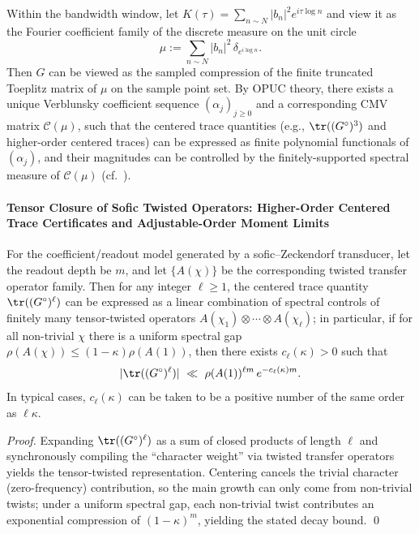 \begin{proposition}\label{prop:gm-toeplitz-cmv-verblunsky-embedding}
Within the bandwidth window, let
\(
K(\tau)=\sum_{n\sim N}|b_n|^2 e^{i\tau\log n}
\)
and view it as the Fourier coefficient family of the discrete measure on the unit circle
\[
\mu:=\sum_{n\sim N}|b_n|^2\,\delta_{e^{i\log n}}.
\]
Then \(G\) can be viewed as the sampled compression of the finite truncated Toeplitz matrix of \(\mu\) on the sample point set.
By OPUC theory, there exists a unique Verblunsky coefficient sequence \((\alpha_j)_{j\ge 0}\) and a corresponding CMV matrix \(\mathcal{C}(\mu)\), such that the centered trace quantities (e.g., \(\tr((G^\circ)^3)\) and higher-order centered traces) can be expressed as finite polynomial functionals of \((\alpha_j)\), and their magnitudes can be controlled by the finitely-supported spectral measure of \(\mathcal{C}(\mu)\) (cf.\ \cite{CanteroMoralVelazquez2003CMV,Simon2005OPUC1}).
\end{proposition}

\paragraph{Tensor Closure of Sofic Twisted Operators: Higher-Order Centered Trace Certificates and Adjustable-Order Moment Limits}
\begin{theorem}\label{thm:gm-tensor-twist-centered-moments}
For the coefficient/readout model generated by a sofic--Zeckendorf transducer, let the readout depth be \(m\), and let \(\{A(\chi)\}\) be the corresponding twisted transfer operator family.
Then for any integer \(\ell\ge 1\), the centered trace quantity \(\tr((G^\circ)^\ell)\) can be expressed as a linear combination of spectral controls of finitely many tensor-twisted operators
\(
A(\chi_1)\otimes\cdots\otimes A(\chi_\ell)
\);
in particular, if for all non-trivial \(\chi\) there is a uniform spectral gap
\(
\rho(A(\chi))\le (1-\kappa)\rho(A(1))
\), then there exists \(c_\ell(\kappa)>0\) such that
\[
|\tr((G^\circ)^\ell)|\ \ll\ \rho(A(1))^{\ell m}\,e^{-c_\ell(\kappa)m}.
\]
In typical cases, \(c_\ell(\kappa)\) can be taken to be a positive number of the same order as \(\ell\kappa\).
\end{theorem}

\begin{proof}
Expanding \(\tr((G^\circ)^\ell)\) as a sum of closed products of length \(\ell\) and synchronously compiling the ``character weight'' via twisted transfer operators yields the tensor-twisted representation.
Centering cancels the trivial character (zero-frequency) contribution, so the main growth can only come from non-trivial twists; under a uniform spectral gap, each non-trivial twist contributes an exponential compression of \((1-\kappa)^m\), yielding the stated decay bound. \qed
\end{proof}

